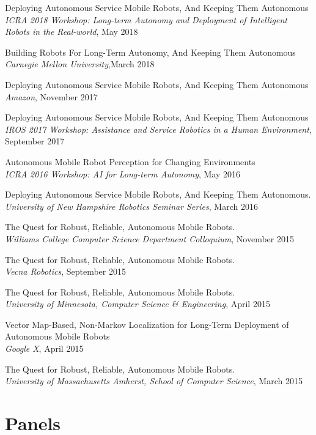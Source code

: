 \documentclass[Times]{article}
\begin{document}
Deploying Autonomous Service Mobile Robots, And Keeping Them Autonomous\\
{\em ICRA 2018 Workshop: Long-term Autonomy and Deployment of Intelligent Robots
in the Real-world}, May 2018

Building Robots For Long-Term Autonomy, And Keeping Them Autonomous\\
{\em Carnegie Mellon University},March 2018

Deploying Autonomous Service Mobile Robots, And Keeping Them Autonomous\\
{\em Amazon}, November 2017

Deploying Autonomous Service Mobile Robots, And Keeping Them Autonomous\\
{\em IROS 2017 Workshop: Assistance and Service Robotics in a Human
Environment}, September 2017

Autonomous Mobile Robot Perception for Changing Environments\\
{\em ICRA 2016 Workshop: AI for Long-term Autonomy}, May 2016

Deploying Autonomous Service Mobile Robots, And Keeping Them Autonomous.\\
{\em University of New Hampshire Robotics Seminar Series}, March 2016

The Quest for Robust, Reliable, Autonomous Mobile Robots.\\
{\em Williams College Computer Science Department Colloquium}, November 2015

The Quest for Robust, Reliable, Autonomous Mobile Robots.\\
{\em Vecna Robotics}, September 2015

The Quest for Robust, Reliable, Autonomous Mobile Robots.\\
{\em University of Minnesota, Computer Science \& Engineering}, April 2015

Vector Map-Based, Non-Markov Localization for Long-Term Deployment of Autonomous Mobile Robots\\
{\em Google X}, April 2015

The Quest for Robust, Reliable, Autonomous Mobile Robots.\\
{\em University of Massachusetts Amherst, School of Computer Science}, March 2015
\par\endgroup

\section*{Panels}
\end{document}
